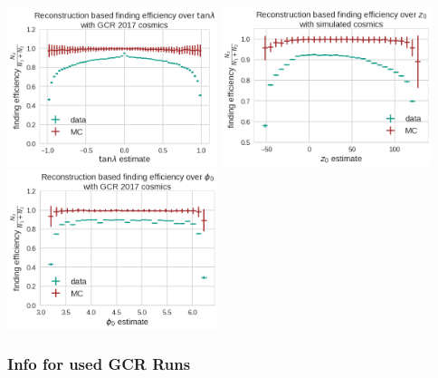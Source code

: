 \documentclass[18pt]{beamer}
\begin{document}
  \begin{frame}
    \begin{center}
      \includegraphics[width=0.46\textwidth]{figures/findeff_tan_lambda_data_mc.png}
      \includegraphics[width=0.46\textwidth]{figures/findeff_z0_data_mc.png}\\
      \includegraphics[width=0.46\textwidth]{figures/findeff_phi0_data_mc.png}
    \end{center}
  \end{frame}

  \begin{frame}[allowframebreaks]
    \frametitle{Info for used GCR Runs}
    \tiny
    
  \end{frame}

  \backupend
  
\end{document}
